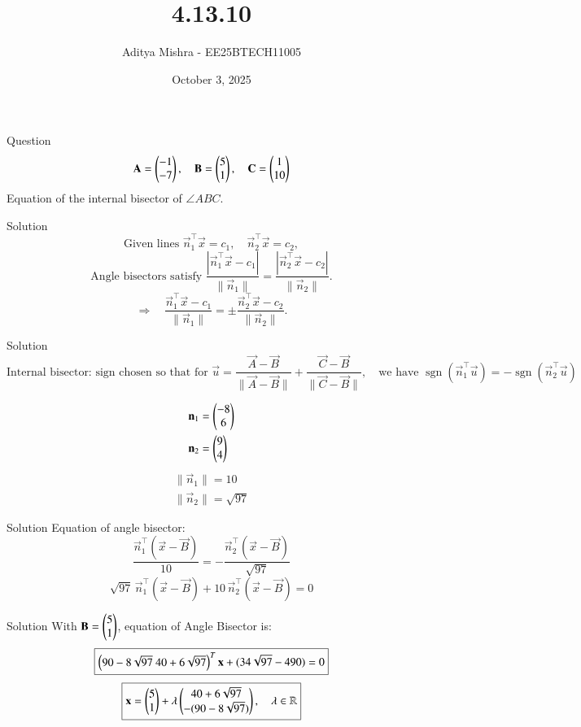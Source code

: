 \documentclass{beamer}
\title{4.13.10}
\author{Aditya Mishra - EE25BTECH11005}
\date{October 3, 2025}
\begin{document}
\begin{frame}
\titlepage
\end{frame}

\begin{frame}{Question}
\[
\mathbf{A} = \begin{pmatrix}-1\\-7\end{pmatrix},\quad
\mathbf{B} = \begin{pmatrix}5\\1\end{pmatrix},\quad
\mathbf{C} = \begin{pmatrix}1\\10\end{pmatrix}
\]
Equation of the internal bisector of $\angle ABC$.
\end{frame}

\begin{frame}{Solution}
\[
\text{Given lines } \vec{n}_1^{\top} \vec{x} = c_1, \quad \vec{n}_2^{\top} \vec{x} = c_2,
\]
\[
\text{Angle bisectors satisfy }
\frac{|\vec{n}_1^{\top} \vec{x} - c_1|}{\|\vec{n}_1\|}
= \frac{|\vec{n}_2^{\top} \vec{x} - c_2|}{\|\vec{n}_2\|}.
\]
\[
\Rightarrow \quad
\frac{\vec{n}_1^{\top} \vec{x} - c_1}{\|\vec{n}_1\|}
= \pm \frac{\vec{n}_2^{\top} \vec{x} - c_2}{\|\vec{n}_2\|}.
\]
\end{frame}

\begin{frame}{Solution}
\[
\text{Internal bisector: sign chosen so that for }
\vec{u} =
\frac{\vec{A}-\vec{B}}{\|\vec{A}-\vec{B}\|}
+
\frac{\vec{C}-\vec{B}}{\|\vec{C}-\vec{B}\|},
\quad

\text{we have }
\operatorname{sgn}(\vec{n}_1^{\top} \vec{u}) = -\operatorname{sgn}(\vec{n}_2^{\top} \vec{u})
\]

\begin{align*}
\mathbf{n}_1 &= \begin{pmatrix}-8\\6\end{pmatrix} \\
\mathbf{n}_2 &= \begin{pmatrix}9\\4\end{pmatrix}
\end{align*}
\begin{align*}
\|\vec{n}_1\| = 10 \\
\|\vec{n}_2\| = \sqrt{97}
\end{align*}
\end{frame}

\begin{frame}{Solution}
Equation of angle bisector:
\[
\frac{\vec{n}_1^{\top} (\vec{x} - \vec{B})}{10}
=
-\frac{\vec{n}_2^{\top} (\vec{x} - \vec{B})}{\sqrt{97}}
\]
\[
\sqrt{97}\,\vec{n}_1^{\top} (\vec{x} - \vec{B}) + 10\,\vec{n}_2^{\top} (\vec{x} - \vec{B}) = 0
\]
\end{frame}

\begin{frame}{Solution}
With
$\mathbf{B} = \begin{pmatrix}5\\1\end{pmatrix}$, equation of Angle Bisector is:
\[
\boxed{ \begin{pmatrix}90-8\sqrt{97} \ 40+6\sqrt{97}\end{pmatrix}^T \mathbf{x} + (34\sqrt{97}-490) = 0 }
\]
\[
\boxed{\mathbf{x} = \begin{pmatrix}5 \\ 1\end{pmatrix} + \lambda\begin{pmatrix}40+6\sqrt{97} \\ -(90-8\sqrt{97})\end{pmatrix},\quad \lambda \in \mathbb{R}}
\]
\end{frame}
\end{document}
